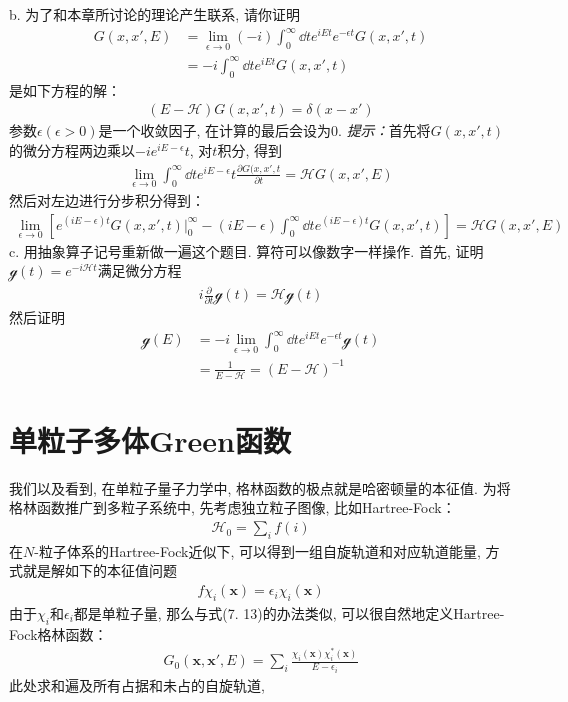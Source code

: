 {\noindent b. 为了和本章所讨论的理论产生联系, 请你证明
\begin{align*}
G(x,x',E) & = \lim_{\epsilon\to0}(-i) \int_0^\infty\dd t e^{iEt}e^{-\epsilon t} G(x,x',t)\\
          & = -i \int_{0}^{\infty}\dd t e^{iEt}G(x,x',t)
\end{align*}
是如下方程的解：
\begin{align*}
(E-\mathscr{H})G(x,x',t) = \delta(x - x')
\end{align*}
参数$\epsilon(\epsilon>0)$是一个收敛因子, 
在计算的最后会设为$0$. 
\textit{提示：}首先将$G(x,x',t)$的微分方程两边乘以$-ie^{iE-\epsilon}t$, 
对$t$积分, 
得到
\begin{align*}
\lim\limits_{\epsilon\to 0} \int_0^\infty\dd t e^{iE-\epsilon}t \frac{\partial G(x,x',t}{\partial t} = \mathscr{H} G(x,x',E)
\end{align*}
然后对左边进行分步积分得到：
\begin{align*}
\lim\limits_{\epsilon\to 0} \left[ e^{(iE-\epsilon)t}G(x,x',t)\Big|_0^\infty - (iE-\epsilon)\int_{0}^{\infty}\dd t e^{(iE-\epsilon)t}G(x,x',t) \right] = \mathscr{H} G(x,x',E)
\end{align*}
\noindent c. 用抽象算子记号重新做一遍这个题目. 算符可以像数字一样操作. 首先, 证明$\mathscr{g}(t) = e^{-i\mathscr{H}t}$满足微分方程
\begin{align*}
i\frac{\partial}{\partial t}\mathscr{g}(t) = \mathscr{Hg}(t)
\end{align*}
然后证明
\begin{align*}
\mathscr{g}(E) &= -i\lim\limits_{\epsilon\to 0}\int_{0}^{\infty} \dd t e^{iEt} e^{-\epsilon t}\mathscr{g}(t)\\
             & = \frac{1}{E-\mathscr{H}} = (E-\mathscr{H})^{-1}
\end{align*}
}

\section{单粒子多体Green函数}
我们以及看到, 
在单粒子量子力学中, 
格林函数的极点就是哈密顿量的本征值. 
为将格林函数推广到多粒子系统中, 
先考虑独立粒子图像, 
比如Hartree-Fock：
\begin{align*}
\mathscr{H}_0 = \sum_i f(i)
\end{align*} 
在$N$-粒子体系的Hartree-Fock近似下, 
可以得到一组自旋轨道和对应轨道能量, 
方式就是解如下的本征值问题
\begin{align}
f\chi_i(\mathbf{x}) = \epsilon_i\chi_i(\mathbf{x})
\end{align}
由于$\chi_i$和$\epsilon_i$都是单粒子量, 
那么与式(7.
13)的办法类似, 
可以很自然地定义Hartree-Fock格林函数：
\begin{align}
G_0(\mathbf{x,x'},E) = \sum_i \frac{\chi_i(\mathbf{x})\chi_i^*(\mathbf{x})}{E-\epsilon_i}
\end{align}
此处求和遍及所有占据和未占的自旋轨道,

